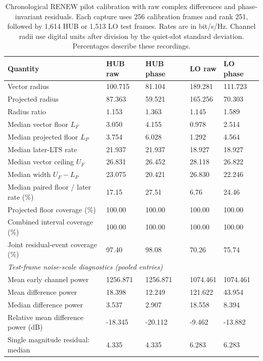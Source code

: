 \documentclass[10pt,letterpaper]{article}
\renewcommand{\thetable}{\arabic{table}}
\begin{document}
\FloatBarrier
\begingroup\renewcommand{\thetable}{\arabic{table}a}
\begin{table}[htbp]\centering\small
\setlength{\tabcolsep}{4pt}
\caption{Chronological RENEW pilot calibration with raw complex differences and phase-invariant residuals. Each capture uses 256 calibration frames and rank 251, followed by 1,614 HUB or 1,513 LO test frames. Rates are in bit/s/Hz. Channel radii use digital units after division by the quiet-slot standard deviation. Percentages describe these recordings.}\label{supp:hardware_calibration}
\begin{tabular}{lllll}\toprule
Quantity & HUB raw & HUB phase & LO raw & LO phase\\
\midrule
Vector radius & 100.715 & 81.104 & 189.281 & 111.723\\
Projected radius & 87.363 & 59.521 & 165.256 & 70.303\\
Radius ratio & 1.153 & 1.363 & 1.145 & 1.589\\
Median vector floor $L_F$ & 3.050 & 4.155 & 0.978 & 2.514\\
Median projected floor $L_P$ & 3.754 & 6.028 & 1.292 & 4.564\\
Median later-LTS rate & 21.937 & 21.937 & 18.927 & 18.927\\
Median vector ceiling $U_F$ & 26.831 & 26.452 & 28.118 & 26.822\\
Median width $U_F-L_P$ & 23.075 & 20.421 & 26.830 & 22.246\\
Median paired floor / later rate (\%) & 17.15 & 27.51 & 6.76 & 24.46\\
Projected floor coverage (\%) & 100.00 & 100.00 & 100.00 & 100.00\\
Combined interval coverage (\%) & 100.00 & 100.00 & 100.00 & 100.00\\
Joint residual-event coverage (\%) & 97.40 & 98.08 & 70.26 & 75.74\\
\multicolumn{5}{l}{\textit{Test-frame noise-scale diagnostics (pooled entries)}}\\
Mean early channel power & 1256.871 & 1256.871 & 1074.461 & 1074.461\\
Mean difference power & 18.398 & 12.249 & 121.622 & 43.954\\
Median difference power & 3.537 & 2.907 & 18.558 & 8.394\\
Relative mean difference power (dB) & -18.345 & -20.112 & -9.462 & -13.882\\
Single magnitude residual: median & 4.335 & 4.335 & 6.283 & 6.283\\

\end{tabular}
\end{table}
\end{document}
